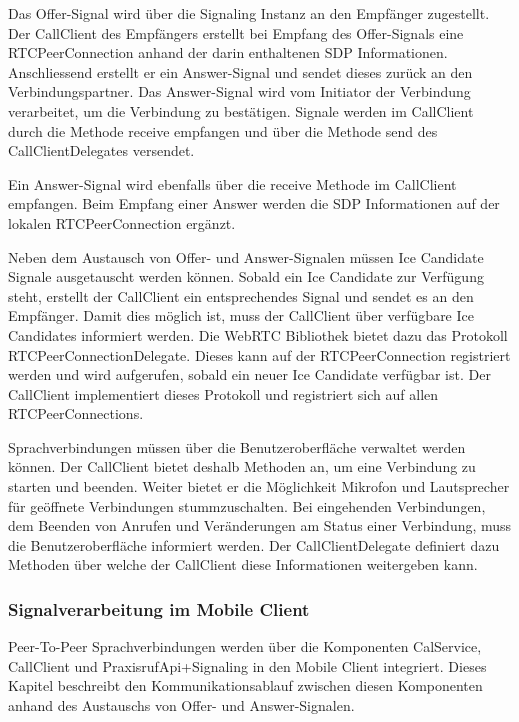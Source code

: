 Das Offer-Signal wird über die Signaling Instanz an den Empfänger zugestellt.
Der CallClient des Empfängers erstellt bei Empfang des Offer-Signals eine RTCPeerConnection anhand der darin enthaltenen SDP Informationen.
Anschliessend erstellt er ein Answer-Signal und sendet dieses zurück an den Verbindungspartner.
Das Answer-Signal wird vom Initiator der Verbindung verarbeitet, um die Verbindung zu bestätigen.
Signale werden im CallClient durch die Methode receive empfangen und über die Methode send des CallClientDelegates versendet.

Ein Answer-Signal wird ebenfalls über die receive Methode im CallClient empfangen.
Beim Empfang einer Answer werden die SDP Informationen auf der lokalen RTCPeerConnection ergänzt.

Neben dem Austausch von Offer- und Answer-Signalen müssen Ice Candidate Signale ausgetauscht werden können.
Sobald ein Ice Candidate zur Verfügung steht, erstellt der CallClient ein entsprechendes Signal und sendet es an den Empfänger.
Damit dies möglich ist, muss der CallClient über verfügbare Ice Candidates informiert werden.
Die WebRTC Bibliothek bietet dazu das Protokoll RTCPeerConnectionDelegate.
Dieses kann auf der RTCPeerConnection registriert werden und wird aufgerufen, sobald ein neuer Ice Candidate verfügbar ist.
Der CallClient implementiert dieses Protokoll und registriert sich auf allen RTCPeerConnections.



Sprachverbindungen müssen über die Benutzeroberfläche verwaltet werden können.
Der CallClient bietet deshalb Methoden an, um eine Verbindung zu starten und beenden.
Weiter bietet er die Möglichkeit Mikrofon und Lautsprecher für geöffnete Verbindungen stummzuschalten.
Bei eingehenden Verbindungen, dem Beenden von Anrufen und Veränderungen am Status einer Verbindung, muss die Benutzeroberfläche informiert werden.
Der CallClientDelegate definiert dazu Methoden über welche der CallClient diese Informationen weitergeben kann.

\subsubsection{Signalverarbeitung im Mobile Client}

Peer-To-Peer Sprachverbindungen werden über die Komponenten CalService, CallClient und PraxisrufApi+Signaling in den Mobile Client integriert.
Dieses Kapitel beschreibt den Kommunikationsablauf zwischen diesen Komponenten anhand des Austauschs von Offer- und Answer-Signalen.


